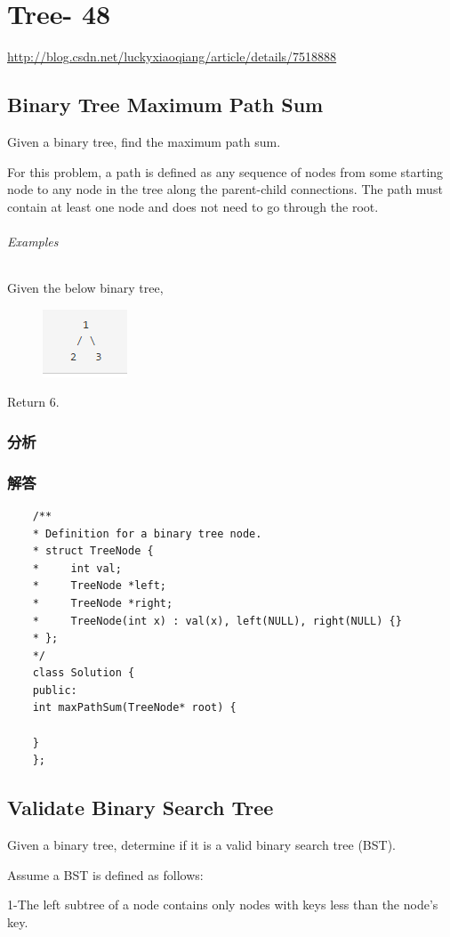 \documentclass[UTF8,a4paper,12pt]{ctexbook}
\begin{document}
\chapter{Tree- 48}
	\url{http://blog.csdn.net/luckyxiaoqiang/article/details/7518888}
\section{Binary Tree Maximum Path Sum}
		Given a binary tree, find the maximum path sum.
		
		For this problem, a path is defined as any sequence of nodes from some starting node to any node in the tree along the parent-child connections. The path must contain at least one node and does not need to go through the root.
	\subparagraph{Examples}
		Given the below binary tree,
		
		\begin{figure}[h]
			\centering
			\includegraphics[scale = 1]{Tree_1.png}
		\end{figure}
		
		Return 6.	
	\subsection{分析}
	
	\subsection{解答}
		\begin{lstlisting}
	/**
	* Definition for a binary tree node.
	* struct TreeNode {
	*     int val;
	*     TreeNode *left;
	*     TreeNode *right;
	*     TreeNode(int x) : val(x), left(NULL), right(NULL) {}
	* };
	*/
	class Solution {
	public:
	int maxPathSum(TreeNode* root) {
	
	}
	};
		\end{lstlisting}
\section{Validate Binary Search Tree}
		Given a binary tree, determine if it is a valid binary search tree (BST).
		
		Assume a BST is defined as follows:
		
		1-The left subtree of a node contains only nodes with keys less than the node's key.
		
\end{document}
